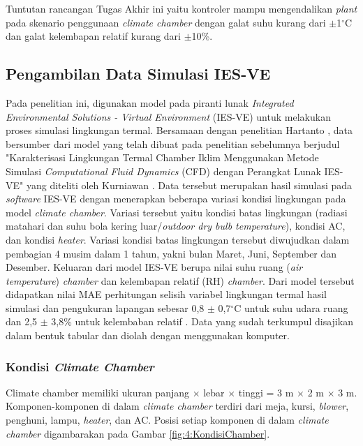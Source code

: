 \documentclass[a4paper,10pt]{article}
\newenvironment{body}{\begin{multicols}{2}}{\end{multicols}}
\begin{document}
\begin{body}
		Tuntutan rancangan Tugas Akhir ini yaitu kontroler mampu mengendalikan \textit{plant} pada skenario penggunaan \textit{climate chamber} dengan galat suhu kurang dari $\pm$1$^\circ$C dan galat kelembapan relatif kurang dari $\pm$10\%.\\
		
		\subsection{Pengambilan Data Simulasi IES-VE}\label{subsec:lang_bench}
		
		Pada penelitian ini, digunakan model pada piranti lunak \textit{Integrated Environmental Solutions - Virtual Environment} (IES-VE) untuk melakukan proses simulasi lingkungan termal. Bersamaan dengan penelitian Hartanto \cite{skripsiTanto}, data bersumber dari model yang telah dibuat pada penelitian sebelumnya berjudul "Karakterisasi Lingkungan Termal Chamber Iklim Menggunakan Metode Simulasi \textit{Computational Fluid Dynamics} (CFD) dengan Perangkat Lunak IES-VE" yang diteliti oleh Kurniawan \cite{skripsiIchfan}.  Data tersebut merupakan hasil simulasi pada \textit{software} IES-VE dengan menerapkan beberapa variasi kondisi lingkungan pada model \textit{climate chamber}. Variasi tersebut yaitu kondisi batas lingkungan (radiasi matahari dan suhu bola kering luar/\textit{outdoor dry bulb temperature}), kondisi AC, dan kondisi \textit{heater}. Variasi kondisi batas lingkungan tersebut diwujudkan dalam pembagian 4 musim dalam 1 tahun, yakni bulan Maret, Juni, September dan Desember. Keluaran dari model IES-VE berupa nilai suhu ruang (\textit{air temperature}) \textit{chamber} dan kelembapan relatif (RH) \textit{chamber}. Dari model tersebut didapatkan nilai MAE perhitungan selisih variabel lingkungan termal hasil simulasi dan pengukuran lapangan sebesar 0,8 $\pm$ 0,7$^{\circ}$C untuk suhu udara ruang dan 2,5 $\pm$ 3,8\% untuk kelembaban relatif \cite{skripsiIchfan}. Data yang sudah terkumpul disajikan dalam bentuk tabular dan diolah dengan menggunakan komputer.\\
		
		\subsubsection{Kondisi \textit{Climate Chamber}}
		
		Climate chamber memiliki ukuran panjang $\times$ lebar $\times$ tinggi = 3 m $\times$ 2 m $\times$ 3 m. Komponen-komponen di dalam \textit{climate chamber} terdiri dari meja, kursi, \textit{blower}, penghuni, lampu, \textit{heater}, dan AC. Posisi setiap komponen di dalam \textit{climate chamber} digambarakan pada Gambar \ref{fig:4:KondisiChamber}.
		

\end{body}
\end{document}
